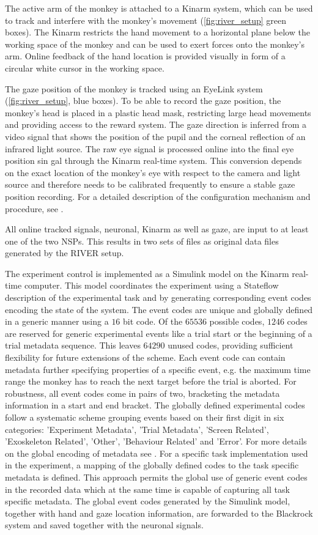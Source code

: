 The active arm of the monkey is attached to a Kinarm system, which can be used to track and interfere with the monkey's movement (\cref{fig:river_setup} green boxes). The Kinarm restricts the hand movement to a horizontal plane below the working space of the monkey and can be used to exert forces onto the monkey's arm. Online feedback of the hand location is provided visually in form of a circular white cursor in the working space.

The gaze position of the monkey is tracked using an EyeLink system (\cref{fig:river_setup}, blue boxes). To be able to record the gaze position, the monkey's head is placed in a plastic head mask, restricting large head movements and providing access to the reward system. The gaze direction is inferred from a video signal that shows the position of the pupil and the corneal reflection of an infrared light source. The raw eye signal is processed online into the final eye position sin gal through the Kinarm real-time system. This conversion depends on the exact location of the monkey's eye with respect to the camera and light source and therefore needs to be calibrated frequently to ensure a stable gaze position recording. For a detailed description of the configuration mechanism and procedure, see \citet{deHaan_2018}.

All online tracked signals, neuronal, Kinarm as well as gaze, are input to at least one of the  two NSPs. This results in two sets of  files as original data files generated by the RIVER setup.

The experiment control is implemented as a Simulink model on the Kinarm real-time computer. This model coordinates the experiment using a Stateflow description of the experimental task and by generating corresponding event codes encoding the state of the system. The event codes are unique and globally defined in a generic manner using a $16$ bit code. Of the $65536$ possible codes, $1246$ codes are reserved for generic experimental events like a trial start or the beginning of a trial metadata sequence. This leaves $64290$ unused codes, providing sufficient flexibility for future extensions of the scheme. Each event code can contain metadata further specifying properties of a specific event, e.g. the maximum time range the monkey has to reach the next target before the trial is aborted. For robustness, all event codes come in pairs of two, bracketing the metadata information in a start and end bracket. The globally defined experimental codes follow a systematic scheme grouping events based on their first digit in six categories: 'Experiment Metadata', 'Trial Metadata', 'Screen Related', 'Exoskeleton Related', 'Other', 'Behaviour Related' and 'Error'. For more details on the global encoding of metadata see \citet{deHaan_2018a}.
For a specific task implementation used in the experiment, a mapping of the globally defined codes to the task specific metadata is defined. This approach permits the global use of generic event codes in the recorded data which at the same time is capable of capturing all task specific metadata. The global event codes generated by the Simulink model, together with hand and gaze location information, are forwarded to the Blackrock system and saved together with the neuronal signals.

